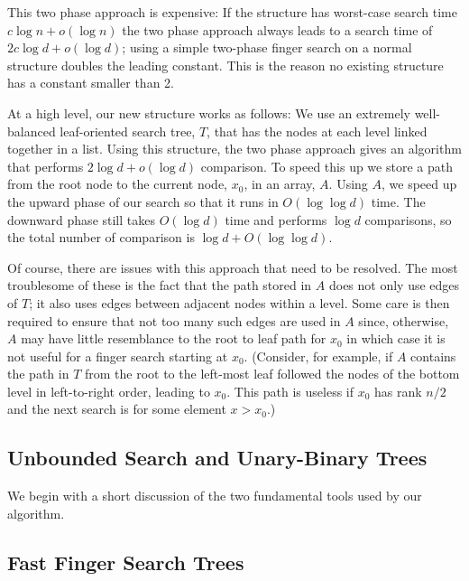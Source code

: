 \documentclass{patmorin}
\begin{document}
This two phase approach is expensive: If the structure has worst-case
search time $c\log n+o(\log n)$ the two phase approach always leads to
a search time of $2c\log d+o(\log d)$; using a simple two-phase finger
search on a normal structure doubles the leading constant.  This is the
reason no existing structure has a constant smaller than 2.

At a high level, our new structure works as follows: We use an
extremely well-balanced leaf-oriented search tree, $T$, that has the
nodes at each level linked together in a list.  Using this structure,
the two phase approach gives an algorithm that performs $2\log d+o(\log
d)$ comparison.  To speed this up we store a path from the root node
to the current node, $x_0$, in an array, $A$. Using $A$, we speed up
the upward phase of our search so that it runs in $O(\log\log d)$ time.
The downward phase still takes $O(\log d)$ time and performs $\log d$
comparisons, so the total number of comparison is $\log d+O(\log\log d)$.

Of course, there are issues with this approach that need to be resolved.
The most troublesome of these is the fact that the path stored in $A$
does not only use edges of $T$; it also uses edges between adjacent
nodes within a level.  Some care is then required to ensure that not too
many such edges are used in $A$ since, otherwise, $A$ may have little
resemblance to the root to leaf path for $x_0$ in which case it is not
useful for a finger search starting at $x_0$.  (Consider, for example, if
$A$ contains the path in $T$ from the root to the left-most leaf followed
the nodes of the bottom level in left-to-right order, leading to $x_0$.
This path is useless if $x_0$ has rank $n/2$ and the next search is for
some element $x>x_0$.)

\subsection{Unbounded Search and Unary-Binary Trees}

We begin with a short discussion of the two fundamental tools used by
our algorithm.

\subsection{Fast Finger Search Trees}
\end{document}
